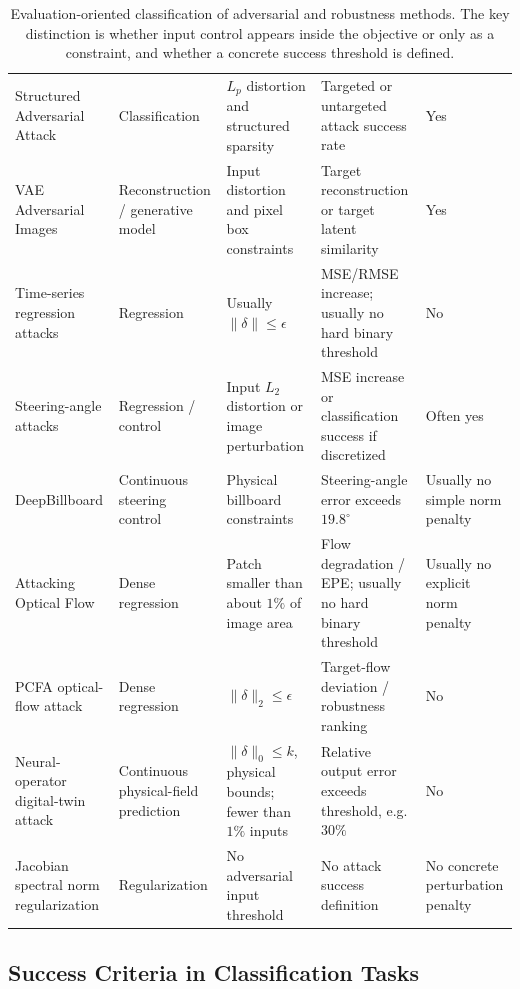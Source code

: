 \documentclass{article}
\begin{document}
\begin{table}[h]
\begin{tabular}{p{3.2cm} p{2.5cm} p{3.5cm} p{3.5cm} p{2.7cm}}
Structured Adversarial Attack
&
Classification
&
\(L_p\) distortion and structured sparsity
&
Targeted or untargeted attack success rate
&
Yes
\\

VAE Adversarial Images
&
Reconstruction / generative model
&
Input distortion and pixel box constraints
&
Target reconstruction or target latent similarity
&
Yes
\\

Time-series regression attacks
&
Regression
&
Usually \(\|\delta\|\leq \epsilon\)
&
MSE/RMSE increase; usually no hard binary threshold
&
No
\\

Steering-angle attacks
&
Regression / control
&
Input \(L_2\) distortion or image perturbation
&
MSE increase or classification success if discretized
&
Often yes
\\

DeepBillboard
&
Continuous steering control
&
Physical billboard constraints
&
Steering-angle error exceeds \(19.8^\circ\)
&
Usually no simple norm penalty
\\

Attacking Optical Flow
&
Dense regression
&
Patch smaller than about \(1\%\) of image area
&
Flow degradation / EPE; usually no hard binary threshold
&
Usually no explicit norm penalty
\\

PCFA optical-flow attack
&
Dense regression
&
\(\|\delta\|_2\leq \epsilon\)
&
Target-flow deviation / robustness ranking
&
No
\\

Neural-operator digital-twin attack
&
Continuous physical-field prediction
&
\(\|\delta\|_0\leq k\), physical bounds; fewer than \(1\%\) inputs
&
Relative output error exceeds threshold, e.g. \(30\%\)
&
No
\\

Jacobian spectral norm regularization
&
Regularization
&
No adversarial input threshold
&
No attack success definition
&
No concrete perturbation penalty
\\
\hline
\end{tabular}
\caption{Evaluation-oriented classification of adversarial and robustness methods. The key distinction is whether input control appears inside the objective or only as a constraint, and whether a concrete success threshold is defined.}
\end{table}

\subsection{Success Criteria in Classification Tasks}
\end{document}
